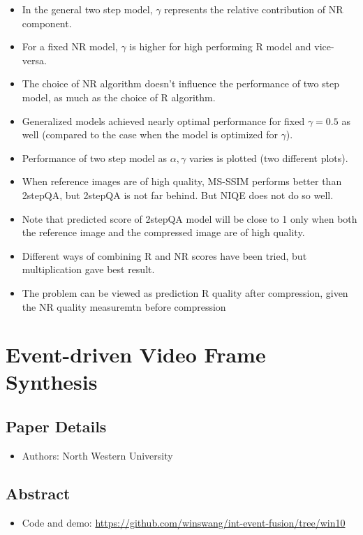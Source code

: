 \documentclass{article}
\begin{document}
\begin{itemize}
        \item In the general two step model, $\gamma$ represents the relative contribution of NR component.
        \item For a fixed NR model, $\gamma$ is higher for high performing R model and vice-versa.
        \item The choice of NR algorithm doesn't influence the performance of two step model, as much as the choice of R algorithm.
        \item Generalized models achieved nearly optimal performance for fixed $\gamma=0.5$ as well (compared to the case when the model is optimized for $\gamma$).
        \item Performance of two step model as $\alpha, \gamma$ varies is plotted (two different plots).
        \item When reference images are of high quality, MS-SSIM performs better than 2stepQA, but 2stepQA is not far behind.
        But NIQE does not do so well.
        \item Note that predicted score of 2stepQA model will be close to 1 only when both the reference image and the compressed image are of high quality.
        \item Different ways of combining R and NR scores have been tried, but multiplication gave best result.
        \item The problem can be viewed as prediction R quality after compression, given the NR quality measuremtn before compression
    \end{itemize}
    \newpage


    \section{Event-driven Video Frame Synthesis}\label{sec:Event_driven_Video_Frame_Synthesis}
    \subsection*{Paper Details}
    \begin{itemize}
        \item Authors: North Western University
    \end{itemize}

    \subsection*{Abstract}
    \begin{itemize}
        \item Code and demo: \url{https://github.com/winswang/int-event-fusion/tree/win10}
    \end{itemize}
\end{document}

